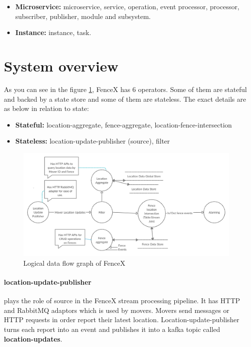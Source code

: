 \documentclass[a4]{report}
\begin{document}
    \begin{itemize}
        \item  \textbf{Microservice:} microservice, service, operation, event processor, processor, subscriber,
        publisher, module and subsystem.
        \item \textbf{Instance:} instance, task.
    \end{itemize}

    \section{System overview}
    As you can see in the figure \ref{fig:logical-dfg}, FenceX has 6 operators.
    Some of them are stateful and backed by a state store and some of them are stateless.
    The exact details are as below in relation to state:

    \begin{itemize}
        \item \textbf{Stateful:} location-aggregate, fence-aggregate, location-fence-intersection
        \item \textbf{Stateless:} location-update-publisher (source), filter
    \end{itemize}

    \begin{figure}[ht]
        \centering
        \caption{Logical data flow graph of FenceX}
        \label{fig:logical-dfg}
        \includegraphics[width=\linewidth ,scale=0.2]{images/logical-data-flow-diagram.png}
    \end{figure}

    \paragraph{location-update-publisher} plays the role of source in the FenceX stream processing pipeline.
    It has HTTP and RabbitMQ adaptors which is used by movers.
    Movers send messages or HTTP requests in order report their latest location.
    Location-update-publisher turns each report into an event and publishes it into a kafka topic called
    \textbf{location-updates}.
\end{document}
